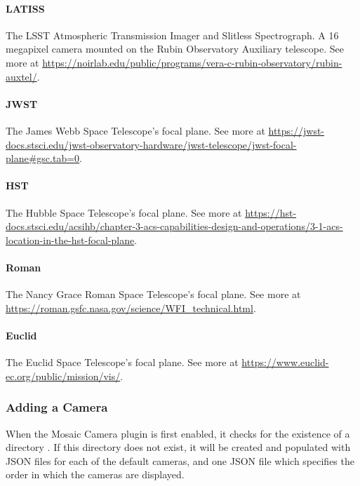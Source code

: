\paragraph{LATISS}

The LSST Atmospheric Transmission Imager and Slitless Spectrograph. A 16 megapixel camera mounted on the Rubin Observatory Auxiliary telescope.
See more at \url{https://noirlab.edu/public/programs/vera-c-rubin-observatory/rubin-auxtel/}.

\paragraph{JWST}

The James Webb Space Telescope's focal plane. See more at \url{https://jwst-docs.stsci.edu/jwst-observatory-hardware/jwst-telescope/jwst-focal-plane#gsc.tab=0}.

\paragraph{HST}

The Hubble Space Telescope's focal plane. See more at \url{https://hst-docs.stsci.edu/acsihb/chapter-3-acs-capabilities-design-and-operations/3-1-acs-location-in-the-hst-focal-plane}.

\paragraph{Roman}

The Nancy Grace Roman Space Telescope's focal plane. See more at \url{https://roman.gsfc.nasa.gov/science/WFI_technical.html}.

\paragraph{Euclid}

The Euclid Space Telescope's focal plane. See more at \url{https://www.euclid-ec.org/public/mission/vis/}.

\subsubsection{Adding a Camera}
\label{sec:plugins:MosaicCamera:cameras:add}
When the Mosaic Camera plugin is first enabled, it checks for the existence of a directory .
If this directory does not exist, it will be created and populated with JSON files for each of the default cameras, and one JSON file  which specifies the order in which the cameras are displayed.

